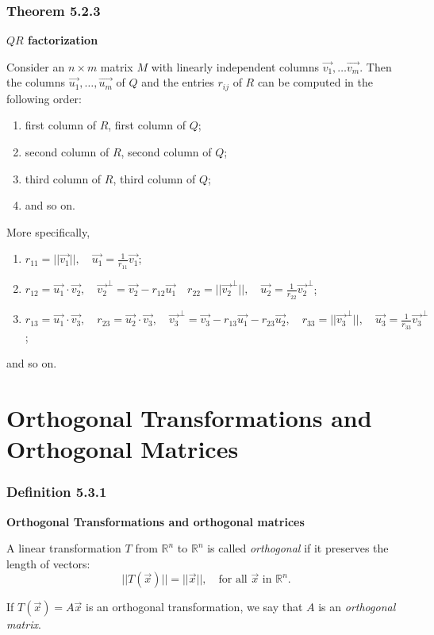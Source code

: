 \documentclass{report}
\begin{document}
\subsubsection*{Theorem 5.2.3}
\par\noindent\textbf{$QR$ factorization}
\par\noindent Consider an $n\times{}m$ matrix $M$ with linearly independent columns $\vec{v_{1}},\ldots{}\vec{v_{m}}$. Then the columns $\vec{u_{1}},\ldots{},\vec{u_{m}}$ of $Q$ and the entries $r_{ij}$ of $R$ can be computed in the following order:
\renewcommand{\labelenumi}{$\quad$}
\begin{enumerate}
\item first column of $R$, first column of $Q$;
\item second column of $R$, second column of $Q$;
\item third column of $R$, third column of $Q$;
\item and so on.
\end{enumerate}
\par\noindent More specifically,
\renewcommand{\labelenumi}{$\quad$}
\begin{enumerate}
\item $\displaystyle r_{11}=||\vec{v_{1}}||,\quad{}\vec{u_{1}}=\frac{1}{r_{11}}\vec{v_{1}}$;
\item $\displaystyle r_{12}=\vec{u_{1}}\cdot{}\vec{v_{2}},\quad{}\vec{v_{2}}^{\perp}=\vec{v_{2}}-r_{12}\vec{u_{1}}\quad{}r_{22}=||\vec{v_{2}}^{\perp}||,\quad{}\vec{u_{2}}=\frac{1}{r_{22}}\vec{v_{2}}^{\perp}$;
\item $\displaystyle r_{13}=\vec{u_{1}}\cdot{}\vec{v_{3}},\quad{}r_{23}=\vec{u_{2}}\cdot{}\vec{v_{3}},\quad{}\vec{v_{3}}^{\perp}=\vec{v_{3}}-r_{13}\vec{u_{1}}-r_{23}\vec{u_{2}},\quad{}r_{33}=||\vec{v_{3}}^{\perp}||,\quad{}\vec{u_{3}}=\frac{1}{r_{33}}\vec{v_{3}}^{\perp}$;
\end{enumerate}
\par\noindent and so on.

\section{Orthogonal Transformations and Orthogonal Matrices}
\subsubsection*{Definition 5.3.1}
\par\noindent\textbf{Orthogonal Transformations and orthogonal matrices}
\par\noindent A linear transformation $T$ from $\mathbb{R}^{n}$ to $\mathbb{R}^{n}$ is called \textit{orthogonal} if it preserves the length of vectors:
\[||T(\vec{x})||=||\vec{x}||,\quad{}\textrm{for all }\vec{x}\textrm{ in }\mathbb{R}^{n}.\]
\par\noindent If $T(\vec{x})=A\vec{x}$ is an orthogonal transformation, we say that $A$ is an \textit{orthogonal matrix}.
\end{document}
